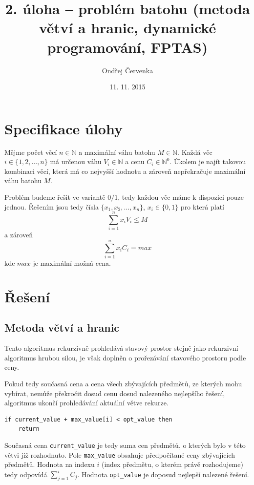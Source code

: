 \documentclass[11pt]{article}
\begin{document}
\title{2. úloha -- problém batohu (metoda větví a hranic, dynamické programování, FPTAS)}
\author{Ondřej Červenka}
\date{11. 11. 2015}
\maketitle

\section{Specifikace úlohy}

Mějme počet věcí $n \in \mathbb{N}$ a maximální váhu batohu $M \in \mathbb{N}$. \newline Každá věc $i \in \{1, 2, \ldots, n\}$ má určenou váhu $V_i \in \mathbb{N}$ a cenu $C_i \in \mathbb{N}^0$. Úkolem je najít takovou kombinaci věcí, která má co nejvyšší hodnotu a zároveň nepřekračuje maximální váhu batohu $M$.

Problém budeme řešit ve variantě $0/1$, tedy každou věc máme k dispozici pouze jednou. Řešením jsou tedy čísla $\{x_1, x_2, \ldots, x_n\}$, $x_i \in \{0,1\}$ pro která platí $$\sum_{i=1}^n x_iV_i \leq M$$ a zároveň $$\sum_{i=1}^n x_iC_i = max $$ kde $max$ je maximální možná cena.

\section{Řešení}

\subsection{Metoda větví a hranic}

Tento algoritmus rekurzivně prohledává stavový prostor stejně jako rekurzivní algoritmus hrubou silou, je však doplněn o prořezávání stavového prostoru podle ceny. 

Pokud tedy současná cena a cena všech zbývajících předmětů, ze kterých mohu vybírat, nemůže překročit dosud cenu dosud nalezeného nejlepšího řešení, algoritmus ukončí prohledávání aktuální větve rekurze.

\begin{lstlisting}
if current_value + max_value[i] < opt_value then
	return
\end{lstlisting}

Současná cena \verb|current_value| je tedy suma cen předmětů, o kterých bylo v této větvi již rozhodnuto. Pole \verb|max_value| obsahuje předpočítané ceny zbývajících předmětů. Hodnota na indexu $i$ (index předmětu, o kterém právě rozhodujeme) tedy odpovídá $\sum_{j=1}^i C_j$. Hodnota \verb|opt_value| je doposud nejlepší nalezené řešení. 
\end{document}
